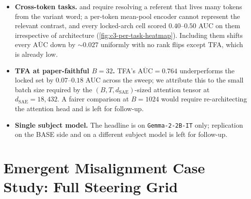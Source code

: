 \begin{itemize}
    \item \textbf{Cross-token tasks.}  and  require resolving a referent that lives many tokens from the variant word; a per-token mean-pool encoder cannot represent the relevant contrast, and every locked-arch cell scored $0.40$--$0.50$ AUC on them irrespective of architecture (\cref{fig:c3-per-task-heatmap}). Including them shifts every $\overline{\mathrm{AUC}}$ down by $\sim\!0.027$ uniformly with no rank flips except TFA, which is already low.
    \item \textbf{TFA at paper-faithful $B=32$.} TFA's $\overline{\mathrm{AUC}} = 0.764$ underperforms the locked set by $0.07$--$0.18$ AUC across the sweep; we attribute this to the small batch size required by the $(B, T, d_{\mathrm{SAE}})$-sized attention tensor at $d_{\mathrm{SAE}} = 18{,}432$. A fairer comparison at $B = 1024$ would require re-architecting the attention head and is left for follow-up.
    \item \textbf{Single subject model.} The headline is on \texttt{Gemma-2-2B-IT} only; replication on the BASE side and on a different subject model is left for follow-up.
\end{itemize}

\section{Emergent Misalignment Case Study: Full Steering Grid}
\label{app:c6}

